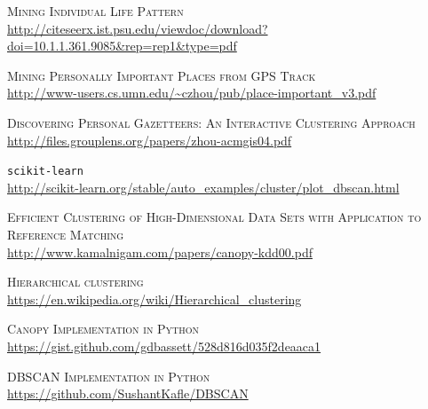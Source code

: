 \documentclass[a4paper, 12pt]{article}
\begin{document}
\newpage

\begin{thebibliography}{50}


\label{lifePatter} \textsc{Mining Individual Life Pattern} \\ \url{http://citeseerx.ist.psu.edu/viewdoc/download?doi=10.1.1.361.9085&rep=rep1&type=pdf}

\label{importantPlaces} \textsc{Mining Personally Important Places from GPS Track} \\ \url{http://www-users.cs.umn.edu/~czhou/pub/place-important_v3.pdf}

\label{clusteringApproach}\textsc{Discovering Personal Gazetteers: An Interactive Clustering Approach} \\ \url{http://files.grouplens.org/papers/zhou-acmgis04.pdf}

\label{scikit-learn} \texttt{scikit-learn} \\ \url{http://scikit-learn.org/stable/auto_examples/cluster/plot_dbscan.html} 

\label{canopy} \textsc{Efficient Clustering of High-Dimensional Data Sets with Application to Reference Matching} \\ \url{http://www.kamalnigam.com/papers/canopy-kdd00.pdf}

\label{jerar} \textsc{Hierarchical clustering} \\ \url{https://en.wikipedia.org/wiki/Hierarchical_clustering}

 \label{canopyGitHub} \textsc{Canopy Implementation in Python} \\ \url{https://gist.github.com/gdbassett/528d816d035f2deaaca1}

 \label{dbscanPython} \textsc{DBSCAN Implementation in Python} \\ \url{https://github.com/SushantKafle/DBSCAN}
\end{thebibliography}
\end{document}
